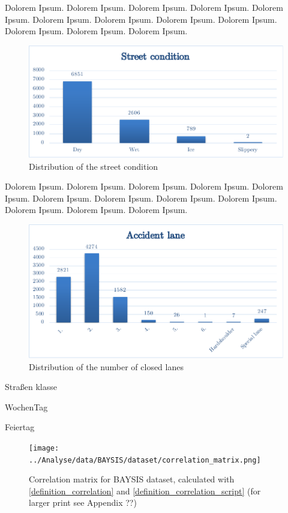 \documentclass[a4paper,12pt]{report}
\begin{document}
Dolorem Ipsum. Dolorem Ipsum. Dolorem Ipsum. Dolorem Ipsum.
Dolorem Ipsum. Dolorem Ipsum. Dolorem Ipsum. Dolorem Ipsum.
Dolorem Ipsum. Dolorem Ipsum. Dolorem Ipsum. Dolorem Ipsum.

\begin{figure}[h]
	\centering
	\includegraphics[scale=0.6]{./assets/baysis_dataset_Zust}
	\caption{Distribution of the street condition}
	\label{img:baysis_dataset_Zust}
\end{figure}

Dolorem Ipsum. Dolorem Ipsum. Dolorem Ipsum. Dolorem Ipsum.
Dolorem Ipsum. Dolorem Ipsum. Dolorem Ipsum. Dolorem Ipsum.
Dolorem Ipsum. Dolorem Ipsum. Dolorem Ipsum. Dolorem Ipsum.

\begin{figure}[H]
	\centering
	\includegraphics[scale=0.6]{./assets/baysis_dataset_Fstf.pdf}
	\caption{Distribution of the number of closed lanes}
	\label{img:baysis_dataset_Fstf}
\end{figure}

Straßen klasse

WochenTag

Feiertag

\begin{figure}[H]
	\centering
	\texttt{[image: ../Analyse/data/BAYSIS/dataset/correlation\_matrix.png]}
	\caption{Correlation matrix for BAYSIS dataset, calculated with \ref{definition_correlation} and \ref{definition_correlation_script} (for larger print see Appendix ??)}
	\label{img:correlation_matrix_dataset}
\end{figure}
\end{document}
